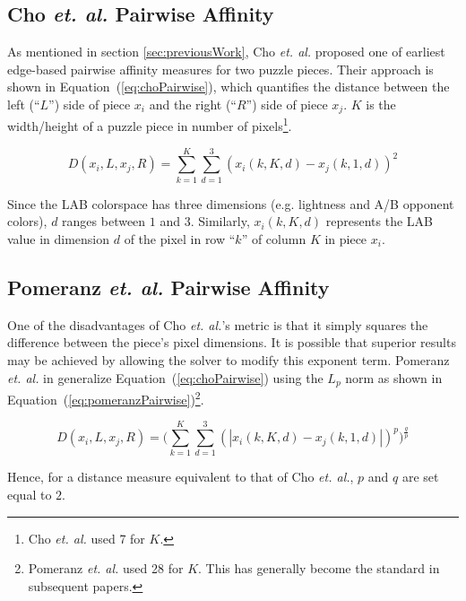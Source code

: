 \documentclass{report}
\def\eref#1{(\ref{#1})}
\begin{document}
\subsection{Cho \textit{et. al.} Pairwise Affinity}\label{sec:choPairwiseAffinity}

As mentioned in section \ref{sec:previousWork}, Cho \textit{et. al.} \cite{cho2010} proposed one of earliest edge-based pairwise affinity measures for two puzzle pieces.  Their approach is shown in Equation~\eref{eq:choPairwise}, which quantifies the distance between the left (``$L$'') side of piece $x_i$ and the right (``$R$'') side of piece $x_j$.  $K$ is the width/height of a puzzle piece in number of pixels\footnote{Cho \textit{et. al.} used 7 for $K$.}.  

\begin{equation} \label{eq:choPairwise}
D(x_i,L,x_j,R) = \sum_{k=1}^{K}\sum_{d=1}^{3}(x_i(k,K,d) - x_j(k,1,d))^2
\end{equation}

Since the LAB colorspace has three dimensions (e.g. lightness and A/B opponent colors), $d$ ranges between $1$ and $3$.  Similarly, $x_i(k,K,d)$ represents the LAB value in dimension $d$ of the pixel in row ``$k$'' of column $K$ in piece $x_i$.

\subsection{Pomeranz \textit{et. al.} Pairwise Affinity}\label{sec:pomeranzPairwiseAffinity}

One of the disadvantages of Cho \textit{et. al.}'s metric is that it simply squares the difference between the piece's pixel dimensions.  It is possible that superior results may be achieved by allowing the solver to modify this exponent term.  Pomeranz \textit{et. al.} in \cite{pomeranz2011} generalize Equation~\eref{eq:choPairwise} using the $L_p$ norm as shown in Equation~\eref{eq:pomeranzPairwise}\footnote{Pomeranz \textit{et. al.} used 28 for $K$.  This has generally become the standard in subsequent papers.}.

\begin{equation} \label{eq:pomeranzPairwise}
D(x_i,L,x_j,R) = \bigg(\sum_{k=1}^{K}\sum_{d=1}^{3}(|x_i(k,K,d) - x_j(k,1,d)|)^p\bigg)^{\frac{q}{p}}
\end{equation}

Hence, for a distance measure equivalent to that of Cho \textit{et. al.}, $p$ and $q$ are set equal to $2$.
\end{document}

